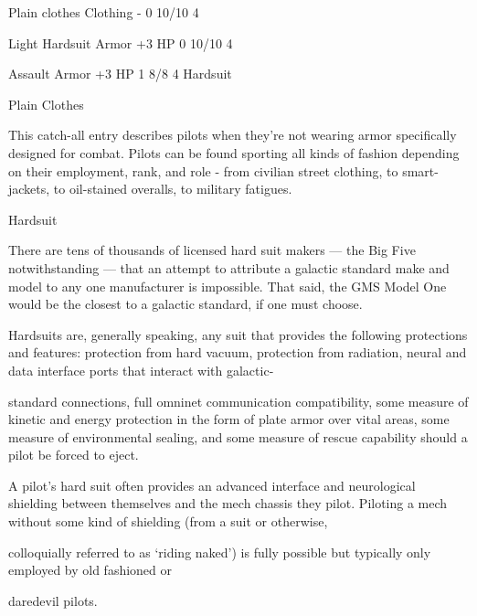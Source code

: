     Plain clothes       Clothing            -                                    0            10/10            4 

    Light Hardsuit      Armor               +3 HP                                0            10/10            4 

    Assault             Armor               +3 HP                                1            8/8              4 
    Hardsuit 

                                                     Plain Clothes
 
This catch-all entry describes pilots when they’re not wearing armor specifically designed for  
combat. Pilots can be found sporting all kinds of fashion depending on their employment, rank,  
and role - from civilian street clothing, to smart-jackets, to oil-stained overalls, to military  
fatigues.
 

                                                                                                                        


                                                         Hardsuit  

There are tens of thousands of licensed hard suit makers — the Big Five notwithstanding — that an attempt  
to attribute a galactic standard make and model to any one manufacturer is impossible. That said, the GMS  
Model One would be the closest to a galactic standard, if one must choose.   

Hardsuits are, generally speaking, any suit that provides the following protections and features: protection  
from hard vacuum, protection from radiation, neural and data interface ports that interact with galactic- 

standard connections, full omninet communication compatibility, some measure of kinetic and energy  
protection in the form of plate armor over vital areas, some measure of environmental sealing, and some  
measure of rescue capability should a pilot be forced to eject.   

A pilot’s hard suit often provides an advanced interface and neurological shielding between themselves and  
the mech chassis they pilot. Piloting a mech without some kind of shielding (from a suit or otherwise,  

colloquially referred to as ‘riding naked’) is fully possible but typically only employed by old fashioned or  

daredevil pilots.   

